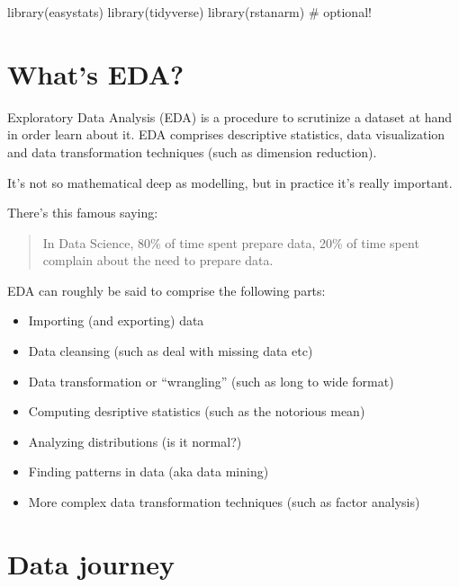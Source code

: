 \documentclass[
  letterpaper,
  DIV=11,
  numbers=noendperiod]{scrreprt}
\newenvironment{Shaded}{\begin{snugshade}}{\end{snugshade}}
\newcommand{\CommentTok}[1]{\textcolor[rgb]{0.37,0.37,0.37}{#1}}
\newcommand{\FunctionTok}[1]{\textcolor[rgb]{0.28,0.35,0.67}{#1}}
\newcommand{\NormalTok}[1]{\textcolor[rgb]{0.00,0.23,0.31}{#1}}
\providecommand{\tightlist}{%
  \setlength{\itemsep}{0pt}\setlength{\parskip}{0pt}}\usepackage{longtable,booktabs,array}
\theoremstyle{definition}
\theoremstyle{definition}
\theoremstyle{remark}
\begin{document}
\begin{Shaded}
\begin{Highlighting}[]
\FunctionTok{library}\NormalTok{(easystats)}
\FunctionTok{library}\NormalTok{(tidyverse)}
\FunctionTok{library}\NormalTok{(rstanarm)  }\CommentTok{\# optional!}
\end{Highlighting}
\end{Shaded}

\hypertarget{whats-eda}{%
\section{What's EDA?}\label{whats-eda}}

Exploratory Data Analysis (EDA) is a procedure to scrutinize a dataset
at hand in order learn about it. EDA comprises descriptive statistics,
data visualization and data transformation techniques (such as dimension
reduction).

It's not so mathematical deep as modelling, but in practice it's really
important.

There's this famous saying:

\begin{quote}
In Data Science, 80\% of time spent prepare data, 20\% of time spent
complain about the need to prepare data.
\end{quote}

EDA can roughly be said to comprise the following parts:

\begin{itemize}
\tightlist
\item
  Importing (and exporting) data
\item
  Data cleansing (such as deal with missing data etc)
\item
  Data transformation or ``wrangling'' (such as long to wide format)
\item
  Computing desriptive statistics (such as the notorious mean)
\item
  Analyzing distributions (is it normal?)
\item
  Finding patterns in data (aka data mining)
\item
  More complex data transformation techniques (such as factor analysis)
\end{itemize}

\hypertarget{sec-data-journey}{%
\section{Data journey}\label{sec-data-journey}}
\end{document}
